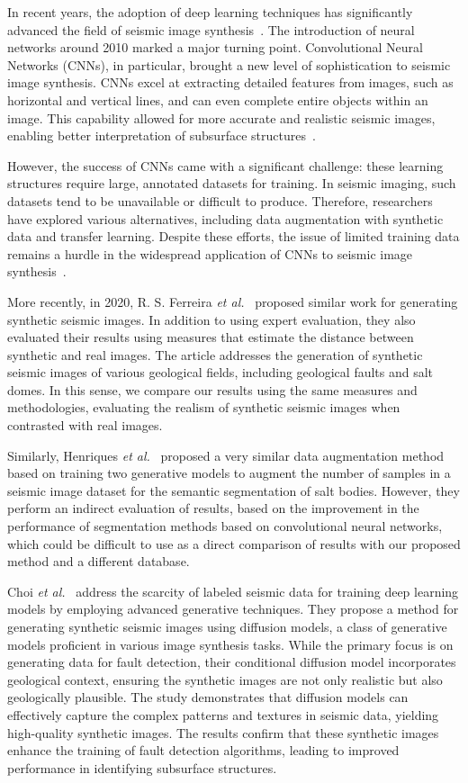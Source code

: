 \documentclass{ieeeaccess}
\begin{document}
In recent years, the adoption of deep learning techniques has significantly advanced the field of seismic image synthesis~\cite{Zeng2019}. The introduction of neural networks around 2010 marked a major turning point. Convolutional Neural Networks (CNNs), in particular, brought a new level of sophistication to seismic image synthesis. CNNs excel at extracting detailed features from images, such as horizontal and vertical lines, and can even complete entire objects within an image. This capability allowed for more accurate and realistic seismic images, enabling better interpretation of subsurface structures~\cite{Powers2011}. 

However, the success of CNNs came with a significant challenge: these learning structures require large, annotated datasets for training. In seismic imaging, such datasets tend to be unavailable or difficult to produce. Therefore, researchers have explored various alternatives, including data augmentation with synthetic data and transfer learning. Despite these efforts, the issue of limited training data remains a hurdle in the widespread application of CNNs to seismic image synthesis~\cite{Wang2021}.

More recently, in 2020, R. S. Ferreira \emph{et al.}~\cite{Ferreira2020} proposed similar work for generating synthetic seismic images. In addition to using expert evaluation, they also evaluated their results using measures that estimate the distance between synthetic and real images. The article addresses the generation of synthetic seismic images of various geological fields, including geological faults and salt domes. In this sense, we compare our results using the same measures and methodologies, evaluating the realism of synthetic seismic images when contrasted with real images.

Similarly, Henriques \emph{et al.}~\cite{Henriques2021} proposed a very similar data augmentation method based on training two generative models to augment the number of samples in a seismic image dataset for the semantic segmentation of salt bodies. However, they perform an indirect evaluation of results, based on the improvement in the performance of segmentation methods based on convolutional neural networks, which could be difficult to use as a direct comparison of results with our proposed method and a different database.

Choi \emph{et al.}~\cite{Choi2025} address the scarcity of labeled seismic data for training deep learning models by employing advanced generative techniques. They propose a method for generating synthetic seismic images using diffusion models, a class of generative models proficient in various image synthesis tasks. While the primary focus is on generating data for fault detection, their conditional diffusion model incorporates geological context, ensuring the synthetic images are not only realistic but also geologically plausible. The study demonstrates that diffusion models can effectively capture the complex patterns and textures in seismic data, yielding high-quality synthetic images. The results confirm that these synthetic images enhance the training of fault detection algorithms, leading to improved performance in identifying subsurface structures.
\end{document}
